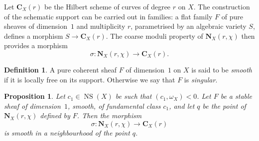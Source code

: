 \documentclass[12pt,english]{smfart}%
\theoremstyle{plain}
\newtheorem{proposition}[theorem]{Proposition}
\theoremstyle{definition}
\newtheorem{definition}[theorem]{Definition}
\theoremstyle{remark}
\DeclareMathOperator{\NS}{NS}
\begin{document}
Let $\mathbf{C}_{X}(r)$ be the Hilbert scheme of curves of degree $r$ on $X$. The construction of the schematic support can be carried out in families: a flat family $F$ of pure sheaves of dimension~$1$ and multiplicity $r$, parametrised by an algebraic variety $S$, defines a morphism $S\to \mathbf{C}_{X}(r)$. The coarse moduli property of $\mathbf{N}_{X}(r,\chi)$ then provides a morphism
\[
\sigma : \mathbf{N}_{X}(r,\chi) \longrightarrow \mathbf{C}_{X}(r).
\]

\begin{definition}\label{def:smooth-sheaf}
A pure coherent sheaf $F$ of dimension~$1$ on $X$ is said to be \emph{smooth} if it is locally free on its support. Otherwise we say that $F$ is \emph{singular}.
\end{definition}

\begin{proposition}\label{prop:sigma-smooth}
Let $c_{1}\in \NS(X)$ be such that $(c_{1},\omega_{X})<0$. Let $F$ be a stable sheaf of dimension~$1$, smooth, of fundamental class $c_{1}$, and let $q$ be the point of $\mathbf{N}_{X}(r,\chi)$ defined by $F$. Then the morphism
\[
\sigma : \mathbf{N}_{X}(r,\chi) \longrightarrow \mathbf{C}_{X}(r)
\]
is smooth in a neighbourhood of the point $q$.
\end{proposition}
\end{document}
